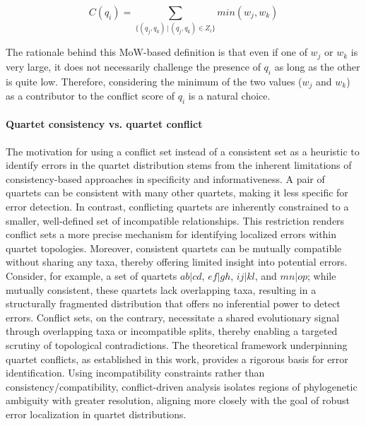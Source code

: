 \documentclass[10pt,a4paper]{article}
\begin{document}
\begin{equation}
\label{eq:min_conflict_score}
C(q_i) = \sum_{\{(q_j, q_k) \,|\, (q_j, q_k) \in Z_i\}} min(w_j , w_k)
\end{equation}

The rationale behind this MoW-based definition is that even if one of $w_j$ or $w_k$ is very large, it does not necessarily challenge the presence of $q_i$ as long as the other is quite low. Therefore, considering the minimum of the two values ($w_j$ and $w_k$) as a contributor to the conflict score of $q_i$ is a natural choice.


\paragraph{Quartet consistency vs. quartet conflict} The motivation for using a conflict set instead of a consistent set as a heuristic to identify errors in the quartet distribution  stems from the inherent limitations of consistency-based approaches in specificity and informativeness. A pair of quartets can be consistent with many other quartets, making it less specific for error detection. In contrast, conflicting quartets are inherently constrained to a smaller, well-defined set of incompatible relationships. This restriction renders conflict sets a more precise mechanism for identifying localized errors within quartet topologies.
Moreover, consistent quartets can be mutually compatible without sharing any taxa, thereby offering limited insight into potential errors.
Consider, for example, a set of quartets $ab|cd$, $ef|gh$, $ij|kl$, and $mn|op$; while mutually consistent, these quartets lack overlapping taxa, resulting in a structurally fragmented distribution that offers no inferential power to detect errors. Conflict sets, on the contrary, necessitate a shared evolutionary signal through overlapping taxa or incompatible splits, thereby enabling a targeted scrutiny of topological contradictions.
The theoretical framework underpinning quartet conflicts, as established in this work, provides a rigorous basis for error identification. Using incompatibility constraints rather than consistency/compatibility, conflict-driven analysis isolates regions of phylogenetic ambiguity with greater resolution, aligning more closely with the goal of robust error localization in quartet distributions.
\end{document}
